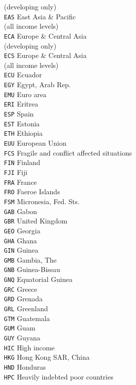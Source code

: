 \begin{multicols}{3}
{(developing only)\\
\texttt{EAS}	East Asia \& Pacific\\
(all income levels)\\
\texttt{ECA}	Europe \& Central Asia\\
(developing only)\\
\texttt{ECS}	Europe \& Central Asia\\
(all income levels)\\
\texttt{ECU}	Ecuador\\
\texttt{EGY}	Egypt, Arab Rep.\\
\texttt{EMU}	Euro area\\
\texttt{ERI}	Eritrea\\
\texttt{ESP}	Spain\\
\texttt{EST}	Estonia\\
\texttt{ETH}	Ethiopia\\
\texttt{EUU}	European Union\\
\texttt{FCS}	Fragile and conflict affected situations\\
\texttt{FIN}	Finland\\
\texttt{FJI}	Fiji\\
\texttt{FRA}	France\\
\texttt{FRO}	Faeroe Islands\\
\texttt{FSM}	Micronesia, Fed. Sts.\\
\texttt{GAB}	Gabon\\
\texttt{GBR}	United Kingdom\\
\texttt{GEO}	Georgia\\
\texttt{GHA}	Ghana\\
\texttt{GIN}	Guinea\\
\texttt{GMB}	Gambia, The\\
\texttt{GNB}	Guinea-Bissau\\
\texttt{GNQ}	Equatorial Guinea\\
\texttt{GRC}	Greece\\
\texttt{GRD}	Grenada\\
\texttt{GRL}	Greenland\\
\texttt{GTM}	Guatemala\\
\texttt{GUM}	Guam\\
\texttt{GUY}	Guyana\\
\texttt{HIC}	High income\\
\texttt{HKG}	Hong Kong SAR, China\\
\texttt{HND}	Honduras\\
\texttt{HPC}	Heavily indebted poor countries\\
}
\end{multicols}
